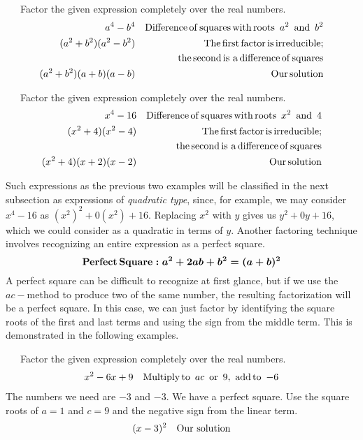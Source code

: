\begin{example}~~~Factor the given expression completely over the real numbers.
  \begin{eqnarray*}
    a^4 - b^4 &  & \operatorname{Difference} \operatorname{of} \operatorname{squares} \operatorname{with}
    \operatorname{roots~} a^2 \operatorname{~and~} b^2\\
    (a^2 + b^2) (a^2 - b^2) &  & \operatorname{The} \operatorname{first} \operatorname{factor}
    \operatorname{is} \operatorname{irreducible};\\
		& & ~~~\operatorname{the} \operatorname{second} \operatorname{is~a}
    \operatorname{difference} \operatorname{of} \operatorname{squares}\\
    (a^2 + b^2) (a + b) (a - b) &  & \operatorname{Our} \operatorname{solution}
  \end{eqnarray*}
\end{example}

\begin{example}~~~Factor the given expression completely over the real numbers.
  \begin{eqnarray*}
    x^4 - 16 &  & \operatorname{Difference} \operatorname{of} \operatorname{squares} \operatorname{with}
    \operatorname{roots~} x^2 \operatorname{~and~} 4\\
    (x^2 + 4) (x^2 - 4) &  & \operatorname{The} \operatorname{first} \operatorname{factor} \operatorname{is}
    \operatorname{irreducible};\\
		& & \operatorname{the} \operatorname{second} \operatorname{is~a} \operatorname{difference}
    \operatorname{of} \operatorname{squares}\\
    (x^2 + 4) (x + 2) (x - 2) &  & \operatorname{Our} \operatorname{solution}
  \end{eqnarray*}
\end{example}

Such expressions as the previous two examples will be classified in the next subsection as expressions of \textit{quadratic type}, since, for example, we may consider $x^4-16$ as $(x^2)^2+0(x^2)+16$.  Replacing $x^2$ with $y$ gives us $y^2+0y+16$, which we could consider as a quadratic in terms of $y$.
\newpage
Another factoring technique involves recognizing an entire expression as a perfect square.
\[ \boldsymbol{\operatorname{Perfect} \operatorname{Square} : a^2 + 2ab + b^2 = (a +
   b)^2} \]
A perfect square can be difficult to recognize at first glance, but if we use
the $ac-$method to produce two of the same number, the resulting factorization will be a perfect
square. In this case, we can just factor by identifying the square roots of the first and last
terms and using the sign from the middle term. This is demonstrated in the following examples.

\begin{example}~~~Factor the given expression completely over the real numbers.
  \begin{eqnarray*}
    x^2 - 6 x + 9 &  & \operatorname{Multiply} \operatorname{to~} ac \operatorname{~or~}9, \operatorname{~add} \operatorname{to~} - 6
  \end{eqnarray*}
	The numbers we need are $-3$ and $-3$.  We have a perfect square.  Use the square roots of $a=1$ and $c=9$ and the negative sign from the linear term.
  \begin{eqnarray*}
    (x - 3)^2 &  & \operatorname{Our~solution}
  \end{eqnarray*}
\end{example}

